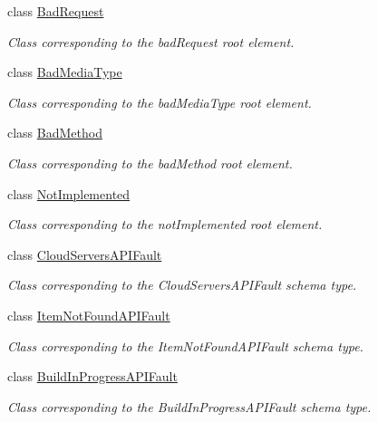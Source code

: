\begin{DoxyCompactItemize}
class \hyperlink{classopenstack_1_1xml_1_1BadRequest}{BadRequest}
\begin{DoxyCompactList}\small\item\em Class corresponding to the badRequest root element. \item\end{DoxyCompactList}\item 
class \hyperlink{classopenstack_1_1xml_1_1BadMediaType}{BadMediaType}
\begin{DoxyCompactList}\small\item\em Class corresponding to the badMediaType root element. \item\end{DoxyCompactList}\item 
class \hyperlink{classopenstack_1_1xml_1_1BadMethod}{BadMethod}
\begin{DoxyCompactList}\small\item\em Class corresponding to the badMethod root element. \item\end{DoxyCompactList}\item 
class \hyperlink{classopenstack_1_1xml_1_1NotImplemented}{NotImplemented}
\begin{DoxyCompactList}\small\item\em Class corresponding to the notImplemented root element. \item\end{DoxyCompactList}\item 
class \hyperlink{classopenstack_1_1xml_1_1CloudServersAPIFault}{CloudServersAPIFault}
\begin{DoxyCompactList}\small\item\em Class corresponding to the CloudServersAPIFault schema type. \item\end{DoxyCompactList}\item 
class \hyperlink{classopenstack_1_1xml_1_1ItemNotFoundAPIFault}{ItemNotFoundAPIFault}
\begin{DoxyCompactList}\small\item\em Class corresponding to the ItemNotFoundAPIFault schema type. \item\end{DoxyCompactList}\item 
class \hyperlink{classopenstack_1_1xml_1_1BuildInProgressAPIFault}{BuildInProgressAPIFault}
\begin{DoxyCompactList}\small\item\em Class corresponding to the BuildInProgressAPIFault schema type. \item\end{DoxyCompactList}\item 

\end{DoxyCompactItemize}
